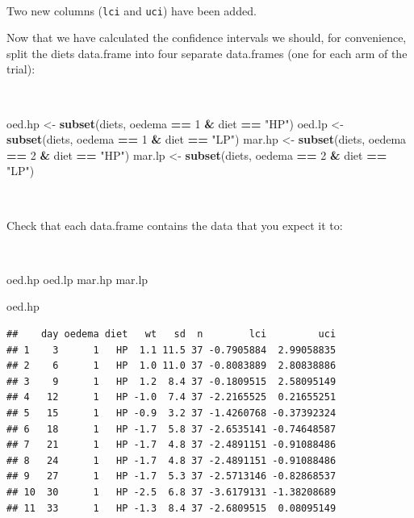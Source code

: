 \documentclass[12pt,a4paper]{book}
\newenvironment{Shaded}{\begin{snugshade}}{\end{snugshade}}
\newcommand{\DecValTok}[1]{\textcolor[rgb]{0.00,0.00,0.81}{#1}}
\newcommand{\KeywordTok}[1]{\textcolor[rgb]{0.13,0.29,0.53}{\textbf{#1}}}
\newcommand{\NormalTok}[1]{#1}
\newcommand{\OperatorTok}[1]{\textcolor[rgb]{0.81,0.36,0.00}{\textbf{#1}}}
\newcommand{\StringTok}[1]{\textcolor[rgb]{0.31,0.60,0.02}{#1}}
\theoremstyle{definition}
\theoremstyle{definition}
\theoremstyle{definition}
\theoremstyle{remark}
\begin{document}
~

Two new columns (\texttt{lci} and \texttt{uci}) have been added.

Now that we have calculated the confidence intervals we should, for
convenience, split the diets data.frame into four separate data.frames
(one for each arm of the trial):

~

\begin{Shaded}
\begin{Highlighting}[]
\NormalTok{oed.hp <-}\StringTok{ }\KeywordTok{subset}\NormalTok{(diets, oedema }\OperatorTok{==}\StringTok{ }\DecValTok{1} \OperatorTok{&}\StringTok{ }\NormalTok{diet }\OperatorTok{==}\StringTok{ "HP"}\NormalTok{)}
\NormalTok{oed.lp <-}\StringTok{ }\KeywordTok{subset}\NormalTok{(diets, oedema }\OperatorTok{==}\StringTok{ }\DecValTok{1} \OperatorTok{&}\StringTok{ }\NormalTok{diet }\OperatorTok{==}\StringTok{ "LP"}\NormalTok{)}
\NormalTok{mar.hp <-}\StringTok{ }\KeywordTok{subset}\NormalTok{(diets, oedema }\OperatorTok{==}\StringTok{ }\DecValTok{2} \OperatorTok{&}\StringTok{ }\NormalTok{diet }\OperatorTok{==}\StringTok{ "HP"}\NormalTok{)}
\NormalTok{mar.lp <-}\StringTok{ }\KeywordTok{subset}\NormalTok{(diets, oedema }\OperatorTok{==}\StringTok{ }\DecValTok{2} \OperatorTok{&}\StringTok{ }\NormalTok{diet }\OperatorTok{==}\StringTok{ "LP"}\NormalTok{)}
\end{Highlighting}
\end{Shaded}

~

Check that each data.frame contains the data that you expect it to:

~

\begin{Shaded}
\begin{Highlighting}[]
\NormalTok{oed.hp}
\NormalTok{oed.lp}
\NormalTok{mar.hp}
\NormalTok{mar.lp}
\end{Highlighting}
\end{Shaded}

\newpage

\begin{Shaded}
\begin{Highlighting}[]
\NormalTok{oed.hp}
\end{Highlighting}
\end{Shaded}

\begin{verbatim}
##    day oedema diet   wt   sd  n        lci         uci
## 1    3      1   HP  1.1 11.5 37 -0.7905884  2.99058835
## 2    6      1   HP  1.0 11.0 37 -0.8083889  2.80838886
## 3    9      1   HP  1.2  8.4 37 -0.1809515  2.58095149
## 4   12      1   HP -1.0  7.4 37 -2.2165525  0.21655251
## 5   15      1   HP -0.9  3.2 37 -1.4260768 -0.37392324
## 6   18      1   HP -1.7  5.8 37 -2.6535141 -0.74648587
## 7   21      1   HP -1.7  4.8 37 -2.4891151 -0.91088486
## 8   24      1   HP -1.7  4.8 37 -2.4891151 -0.91088486
## 9   27      1   HP -1.7  5.3 37 -2.5713146 -0.82868537
## 10  30      1   HP -2.5  6.8 37 -3.6179131 -1.38208689
## 11  33      1   HP -1.3  8.4 37 -2.6809515  0.08095149
\end{verbatim}
\end{document}

